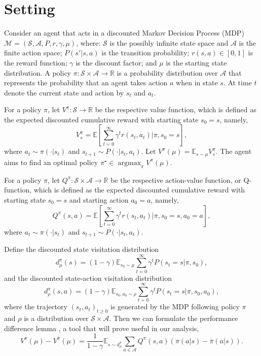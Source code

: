 \documentclass[a4paper,12pt]{article}
\numberwithin{theorem}{section}
\newcommand\E{\mathbb{E}}
\newcommand\A{\mathcal{A}}
\newcommand\M{\mathcal{M}}
\newcommand\R{\mathbb{R}}
\renewcommand\S{\mathcal{S}}
\newcommand\1{\mathbf{1}}
\newcommand{\argmax}{\mathop{\mathrm{argmax}}}
\begin{document}
\section{Setting}
\label{sec:setting}
Consider an agent that acts in a discounted Markov Decision Process (MDP) $\M=(\S,\A,P,r,\gamma,\mu)$, where: $\S$ is the possibly infinite state space and $\A$ is the finite action space; $P(s'| s,a)$ is the transition probability; $r(s,a)\in [0,1]$ is the reward function; $\gamma$ is the discount factor; and $\mu$ is the starting state distribution.
A policy $\pi:\S\times\A\rightarrow\R$ is a probability distribution over $\A$ that represents the probability that an agent takes action $a$ when in state $s$. At time $t$ denote the current state and action by $s_t$ and $a_t$.

For a policy $\pi$, let $V^\pi:\S\rightarrow\R$ be the respective value function, which is defined as the expected discounted cumulative reward with starting state $s_0=s$, namely,
\[V^\pi_s= \mathbb{E}\left[\sum_{t=0}^{\infty}\gamma^t r(s_t,a_t) \bigg| \pi, s_0 = s\right],\]
where $a_t\sim\pi(\cdot|s_t)$ and $s_{t+1}\sim P(\cdot|s_t,a_t)$. Let $V^\pi(\mu) = \E_{s\sim\mu}V^\pi_s$. The agent aims to find an optimal policy $\pi^\star\in \argmax_\pi V^\pi(\mu)$. 

For a policy $\pi$, let $Q^\pi:\S\times\A\rightarrow\R$ be the respective action-value function, or Q-function, which is defined as the expected discounted cumulative reward with starting state $s_0=s$ and starting action $a_0=a$, namely,
\[Q^\pi(s, a) =\E\left[\sum_{t=0}^\infty \gamma^t r(s_t, a_t)\bigg|\pi,  s_0=s,a_0=a\right],\]
where $a_t\sim\pi(\cdot|s_t)$ and $s_{t+1}\sim P(\cdot|s_t,a_t)$. %

Define the discounted state visitation distribution \citep{RN158}
\[d_{\mu}^\pi(s)= (1-\gamma)\E_{s_0 \sim \mu}\sum_{t=0}^{\infty}\gamma^t P(s_t = s|\pi, s_0),\]
and the discounted state-action visitation distribution
\[d_{\rho}^\pi(s,a)= (1-\gamma)\E_{s_0,a_0 \sim \rho}\sum_{t=0}^{\infty}\gamma^t P(s_t = s|\pi, s_0, a_0),\]
where the trajectory ${(s_t,a_t)}_{t\geq0}$ is generated by the MDP following policy $\pi$ and $\rho$ is a distribution over $\S\times\A$. Then we can formulate the performance difference lemma \citep{RN281}, a tool that will prove useful in our analysis,
\begin{equation}
	\label{lemma:pdiff}
	V^\pi(\mu)-V^{\bar{\pi}}(\mu) = \frac{1}{1-\gamma}\E_{s\sim d_\mu^{\bar{\pi}}}\sum_{a\in\A}Q^\pi(s,a)(\pi(a|s)-\bar{\pi}(a|s)).
\end{equation}
\end{document}
